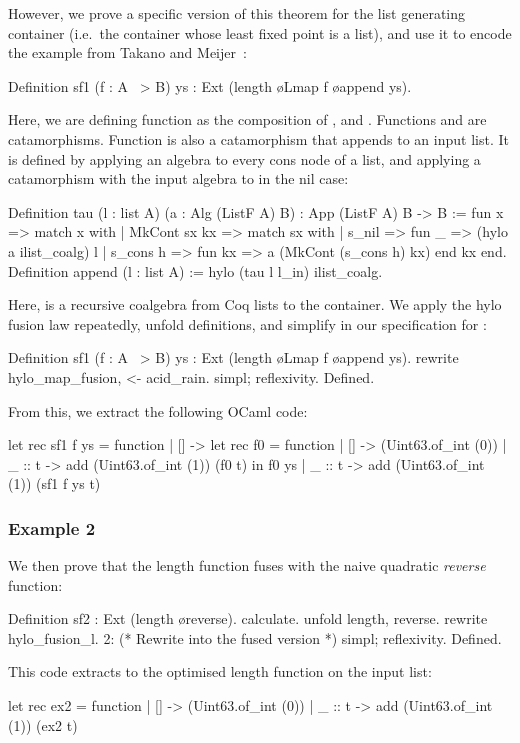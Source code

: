 \documentclass[anonymous, a4paper, UKenglish, cleveref, autoref, thm-restate]{lipics-v2021}
\begin{document}
However, we prove a specific version of this theorem for the list generating
container (i.e.\ the container whose least fixed point is a list), and use it
to encode the example from Takano and Meijer~\cite{TakanoM95}:
\begin{coqcode}
Definition sf1 (f : A ~> B) ys : Ext (length \o Lmap f \o append ys).
\end{coqcode}
Here, we are defining function  as the composition of ,
 and . Functions  and  are
catamorphisms. Function  is also a catamorphism that
appends  to an input list. It is defined by applying an algebra to
every cons node of a list, and applying a catamorphism with the input algebra
to  in the nil case:
\begin{coqcode}
Definition tau (l : list A) (a : Alg (ListF A) B) : App (ListF A) B -> B :=
  fun x => match x with | MkCont sx kx => match sx with
  | s_nil => fun _ => (hylo a ilist_coalg) l
  | s_cons h => fun kx => a (MkCont (s_cons h) kx)
  end kx end.
Definition append (l : list A) := hylo (tau l l_in) ilist_coalg.
\end{coqcode}
Here,  is a recursive coalgebra from Coq lists to the
 container. We apply the hylo fusion law repeatedly, unfold
definitions, and simplify in our specification for : 
\begin{coqcode}
Definition sf1 (f : A ~> B) ys : Ext (length \o Lmap f \o append ys).
  rewrite hylo_map_fusion, <- acid_rain.
  simpl; reflexivity.
Defined.
\end{coqcode}
From this, we extract the following OCaml code:
\begin{ocamlcode}
let rec sf1 f ys = function | [] -> let rec f0 = function
                                      | [] -> (Uint63.of_int (0))
                                      | _ :: t -> add (Uint63.of_int (1)) (f0 t)
                                    in f0 ys
                            | _ :: t -> add (Uint63.of_int (1)) (sf1 f ys t)
\end{ocamlcode}

\subsubsection{Example 2} We then prove that the length function fuses with
the naive quadratic \emph{reverse} function:
\begin{coqcode}
Definition sf2 : Ext (length \o reverse). 
  calculate.  unfold length, reverse. rewrite hylo_fusion_l. 
  2:{ (* Rewrite into the fused version *) }
  simpl; reflexivity.
Defined.
\end{coqcode}
This code extracts to the optimised length function on the input list:
\begin{ocamlcode}
let rec ex2 = function | [] -> (Uint63.of_int (0))
                       | _ :: t -> add (Uint63.of_int (1)) (ex2 t)
\end{ocamlcode}
\end{document}
